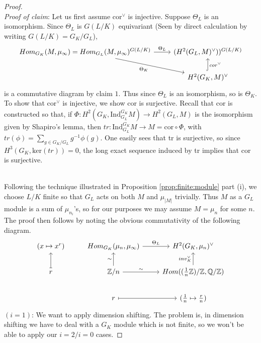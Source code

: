 \documentclass[class=article, crop=false]{standalone}
\begin{document}
\begin{proof}
\\
\textit{Proof of claim}: Let us first assume cor$^{\vee}$ is injective. Suppose $\Theta_L$ is an isomorphism. Since $\Theta_L$ is $G(L/K)$ equivariant (Seen by direct calculation by writing $G(L/K)=G_K/G_L$),
\[\begin{tikzcd}
{Hom_{G_K}(M,\mu_{\infty})=Hom_{G_L}(M,\mu_{\infty})^{G(L/K)}} \arrow[rd, "\Theta_K"'] \arrow[r, "\Theta_L"] & {(H^2(G_L,M)^{\vee}))^{G(L/K)}}                      \\
                                                                                                                & {H^2(G_K,M)^{\vee}} \arrow[u, "cor^{\vee}"', hook]
\end{tikzcd}\]
is a commutative diagram by claim $1$. Thus since $\Theta_L$ is an isomorphism, so is $\Theta_K$.
\vskip 3pt
To show that cor$^{\vee}$ is injective, we show cor is surjective. Recall that cor is constructed so that, if $\Phi:H^2(G_K, \text{Ind}_{G_L}^{G_K}M) \to H^2(G_L,M)$ is the isomorphism given by Shapiro's lemma, then $tr:\text{Ind}_{G_L}^{G_K}M \to M = \text{cor}\circ \Phi$, with $tr(\phi) = \sum_{g\in G_K/G_L}g^{-1}\phi(g)$. One easily sees that tr is surjective, so since $H^3(G_K, \text{ker}(tr)) = 0$, the long exact sequence induced by tr implies that cor is surjective.
\par 
\mbox{}\hfill \qedsymbol
\\
Following the technique illustrated in 
Proposition \ref{prop:finite:module} part (i), 
we choose $L/K$ finite so that $G_L$ acts on both $M$ and $\mu_{|M|}$ trivially. Thus $M$ as a $G_L$ module is a sum of $\mu_{n_i}$'s, so for our purposes we may assume $M=\mu_n$ for some $n$.
\vskip 5pt
The proof then follows by noting the obvious commutativity of the following diagram.
\[\begin{tikzcd}
(x\mapsto x^r)       & {Hom_{G_K}(\mu_n, \mu_{\infty})} \arrow[r, "\Theta_L"] & {H^2(G_K, \mu_n)^{\vee}}                                                                   \\
r \arrow[u, maps to] & \mathbb{Z}/n \arrow[u, "\sim"] \arrow[r, "\sim"]       & {Hom((\frac{1}{n}\mathbb{Z})/\mathbb{Z}, \mathbb{Q}/\mathbb{Z})} \arrow[u, "inv_K^{\vee}"] \\
                     & r \arrow[r, maps to]                                   & (\frac{1}{n} \mapsto \frac{r}{n})                                                         
\end{tikzcd}\]
$(i=1)$: \coproof
We want to apply dimension shifting. The problem is, in dimension shifting we have to deal with a $G_K$ module which is not finite, so we won't be able to apply our $i=2/i=0$ cases.

\end{proof}
\end{document}

